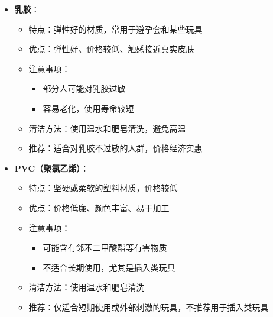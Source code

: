 \documentclass[12pt,UTF8]{ctexbook}
\begin{document}
\begin{itemize}
\begin{itemize}
		\item 分类：
		\begin{itemize}
			\item 天然皮革：真实的动物皮革，质感最好
			\item 合成皮革：人工合成的皮革，价格较低
		\end{itemize}
		\item 注意事项：
		\begin{itemize}
			\item 需要定期保养，避免潮湿
			\item 清洁时需使用专门的皮革清洁剂
		\end{itemize}
		\item 清洁方法：使用专门的皮革清洁剂，避免水洗
		\item 推荐：适合束缚类玩具和情趣服装，增加SM游戏的真实感
	\end{itemize}
	\item \textbf{乳胶}：
	\begin{itemize}
		\item 特点：弹性好的材质，常用于避孕套和某些玩具
		\item 优点：弹性好、价格较低、触感接近真实皮肤
		\item 注意事项：
		\begin{itemize}
			\item 部分人可能对乳胶过敏
			\item 容易老化，使用寿命较短
		\end{itemize}
		\item 清洁方法：使用温水和肥皂清洗，避免高温
		\item 推荐：适合对乳胶不过敏的人群，价格经济实惠
	\end{itemize}
	\item \textbf{PVC（聚氯乙烯）}：
	\begin{itemize}
		\item 特点：坚硬或柔软的塑料材质，价格较低
		\item 优点：价格低廉、颜色丰富、易于加工
		\item 注意事项：
		\begin{itemize}
			\item 可能含有邻苯二甲酸酯等有害物质
			\item 不适合长期使用，尤其是插入类玩具
		\end{itemize}
		\item 清洁方法：使用温水和肥皂清洗
		\item 推荐：仅适合短期使用或外部刺激的玩具，不推荐用于插入类玩具
	\end{itemize}
\end{itemize}
\end{document}
